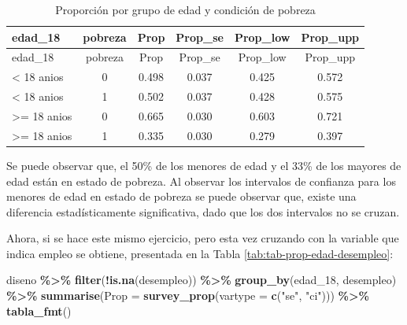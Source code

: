 \documentclass[
  spanish,
  12pt,
]{book}
\newenvironment{Shaded}{\begin{snugshade}}{\end{snugshade}}
\newcommand{\AttributeTok}[1]{\textcolor[rgb]{0.13,0.29,0.53}{#1}}
\newcommand{\FunctionTok}[1]{\textcolor[rgb]{0.13,0.29,0.53}{\textbf{#1}}}
\newcommand{\NormalTok}[1]{#1}
\newcommand{\SpecialCharTok}[1]{\textcolor[rgb]{0.81,0.36,0.00}{\textbf{#1}}}
\newcommand{\StringTok}[1]{\textcolor[rgb]{0.31,0.60,0.02}{#1}}
\begin{document}
\begin{longtable}[]{@{}lccccc@{}}
\caption{\label{tab:tab-prop-edad-pobreza}Proporción por grupo de edad y condición de pobreza}\tabularnewline
\toprule\noalign{}
edad\_18 & pobreza & Prop & Prop\_se & Prop\_low & Prop\_upp \\
\midrule\noalign{}
\endfirsthead
\toprule\noalign{}
edad\_18 & pobreza & Prop & Prop\_se & Prop\_low & Prop\_upp \\
\midrule\noalign{}
\endhead
\bottomrule\noalign{}
\endlastfoot
\textless{} 18 anios & 0 & 0.498 & 0.037 & 0.425 & 0.572 \\
\textless{} 18 anios & 1 & 0.502 & 0.037 & 0.428 & 0.575 \\
\textgreater= 18 anios & 0 & 0.665 & 0.030 & 0.603 & 0.721 \\
\textgreater= 18 anios & 1 & 0.335 & 0.030 & 0.279 & 0.397 \\
\end{longtable}

Se puede observar que, el 50\% de los menores de edad y el 33\% de los mayores de edad están en estado de pobreza. Al observar los intervalos de confianza para los menores de edad en estado de pobreza se puede observar que, existe una diferencia estadísticamente significativa, dado que los dos intervalos no se cruzan.

Ahora, si se hace este mismo ejercicio, pero esta vez cruzando con la variable que indica empleo se obtiene, presentada en la Tabla \ref{tab:tab-prop-edad-desempleo}:

\begin{Shaded}
\begin{Highlighting}[]
\NormalTok{diseno }\SpecialCharTok{\%\textgreater{}\%} 
  \FunctionTok{filter}\NormalTok{(}\SpecialCharTok{!}\FunctionTok{is.na}\NormalTok{(desempleo)) }\SpecialCharTok{\%\textgreater{}\%}
  \FunctionTok{group\_by}\NormalTok{(edad\_18, desempleo) }\SpecialCharTok{\%\textgreater{}\%} 
  \FunctionTok{summarise}\NormalTok{(}\AttributeTok{Prop =} \FunctionTok{survey\_prop}\NormalTok{(}\AttributeTok{vartype =}  \FunctionTok{c}\NormalTok{(}\StringTok{"se"}\NormalTok{, }\StringTok{"ci"}\NormalTok{))) }\SpecialCharTok{\%\textgreater{}\%}
  \FunctionTok{tabla\_fmt}\NormalTok{()}
\end{Highlighting}
\end{Shaded}
\end{document}
